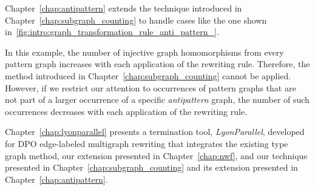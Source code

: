  Chapter~\ref{chap:antipattern} extends the technique introduced in Chapter~\ref{chap:subgraph_counting} to handle cases like the one shown in~\autoref{fig:intro:graph_transformation_rule_anti_pattern_}.
 \begin{figure}[!ht]
    \centering
{}
  \caption{}
  \label{fig:intro:graph_transformation_rule_anti_pattern_}
 \end{figure} 
In this example, the number of injective graph homomorphisms from every pattern graph increases with each application of the rewriting rule. Therefore, the method introduced in Chapter~\ref{chap:subgraph_counting} cannot be applied. However, if we restrict our attention to occurrences of pattern graphs that are not part of a larger occurrence of a specific \emph{antipattern} graph, the number of such occurrences decreases with each application of the rewriting rule.
 
 Chapter~\ref{chap:lyonparallel} presents a termination tool, \textit{LyonParallel}, developed for DPO edge-labeled multigraph rewriting that integrates the existing type graph method, our extension presented in Chapter~\ref{chap:nwf}, and our technique presented in Chapter~\ref{chap:subgraph_counting} and its extension presented in Chapter~\ref{chap:antipattern}.

